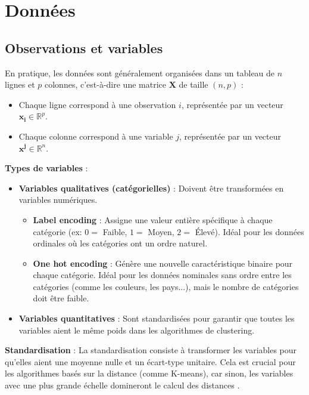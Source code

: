 \documentclass[10pt,a4paper]{article}
\begin{document}
\section*{Données}

\subsection*{Observations et variables}

En pratique, les données sont généralement organisées dans un tableau de $n$ lignes et $p$ colonnes, c'est-à-dire une matrice $\mathbf{X}$ de taille $(n, p)$ :
\begin{itemize}
    \item Chaque ligne correspond à une observation $i$, représentée par un vecteur $\mathbf{x}_{\mathbf{i}} \in \mathbb{R}^{p}$.
    \item Chaque colonne correspond à une variable $j$, représentée par un vecteur $\mathbf{x}^{\mathbf{j}} \in \mathbb{R}^{n}$.
\end{itemize}

\textbf{Types de variables} :
\begin{itemize}
    \item \textbf{Variables qualitatives (catégorielles)} : Doivent être transformées en variables numériques.
    \begin{itemize}
        \item \textbf{Label encoding} : Assigne une valeur entière spécifique à chaque catégorie (ex: $0=$ Faible, $1=$ Moyen, $2=$ Élevé). Idéal pour les données ordinales où les catégories ont un ordre naturel.
        \item \textbf{One hot encoding} : Génère une nouvelle caractéristique binaire pour chaque catégorie. Idéal pour les données nominales sans ordre entre les catégories (comme les couleurs, les pays...), mais le nombre de catégories doit être faible.
    \end{itemize}
    \item \textbf{Variables quantitatives} : Sont standardisées pour garantir que toutes les variables aient le même poids dans les algorithmes de clustering.
\end{itemize}

\textbf{Standardisation} :
La standardisation consiste à transformer les variables pour qu'elles aient une moyenne nulle et un écart-type unitaire. Cela est crucial pour les algorithmes basés sur la distance (comme K-means), car sinon, les variables avec une plus grande échelle domineront le calcul des distances \cite{scikit-learn-preprocessing}.
\end{document}
